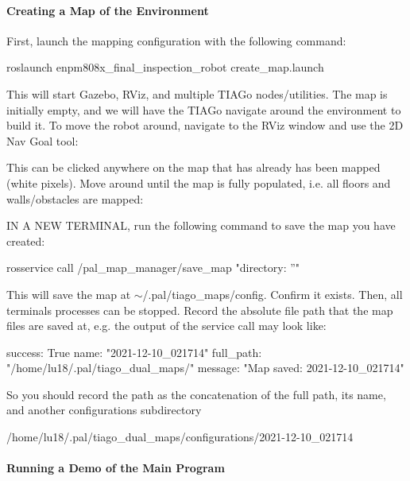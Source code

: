 \paragraph*{Creating a Map of the Environment}

First, launch the mapping configuration with the following command\+: 
\begin{DoxyCode}
roslaunch enpm808x\_final\_inspection\_robot create\_map.launch
\end{DoxyCode}


This will start Gazebo, R\+Viz, and multiple T\+I\+A\+Go nodes/utilities. The map is initially empty, and we will have the T\+I\+A\+Go navigate around the environment to build it. To move the robot around, navigate to the R\+Viz window and use the \textquotesingle{}2D Nav Goal\textquotesingle{} tool\+:



This can be clicked anywhere on the map that has already has been mapped (white pixels). Move around until the map is fully populated, i.\+e. all floors and walls/obstacles are mapped\+:



IN A N\+EW T\+E\+R\+M\+I\+N\+AL, run the following command to save the map you have created\+: 
\begin{DoxyCode}
rosservice call /pal\_map\_manager/save\_map "directory: ''"
\end{DoxyCode}


This will save the map at $\sim$/.pal/tiago\+\_\+maps/config. Confirm it exists. Then, all terminals\textquotesingle{} processes can be stopped. Record the absolute file path that the map files are saved at, e.\+g. the output of the service call may look like\+: 
\begin{DoxyCode}
success: True
name: "2021-12-10\_021714"
full\_path: "/home/lu18/.pal/tiago\_dual\_maps/"
message: "Map saved: 2021-12-10\_021714"
\end{DoxyCode}


So you should record the path as the concatenation of the full path, its name, and another \textquotesingle{}configurations\textquotesingle{} subdirectory 
\begin{DoxyCode}
/home/lu18/.pal/tiago\_dual\_maps/configurations/2021-12-10\_021714
\end{DoxyCode}


\paragraph*{Running a Demo of the Main Program}

